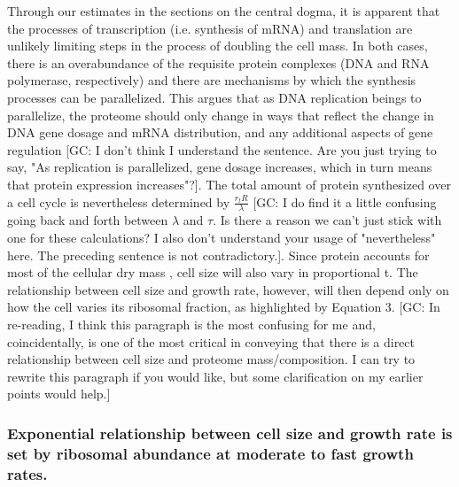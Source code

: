 Through our estimates in the sections on the central dogma, it is
apparent that the processes of transcription (i.e. synthesis of mRNA) and
translation are unlikely limiting steps in the process of doubling the
cell mass. In both cases, there is an overabundance of the requisite protein
complexes (DNA and RNA polymerase, respectively) and there are mechanisms by
which the synthesis processes can be parallelized. This argues that as DNA replication beings to parallelize, the
proteome should only change in ways that reflect the change in DNA gene dosage
and mRNA distribution, and any additional aspects of gene regulation
{\color{red}[GC: I don't think I understand the sentence. Are you just trying to
say, "As replication is parallelized, gene dosage increases, which in turn means
that protein expression increases"?]}.
The total amount of protein synthesized over a cell cycle is nevertheless
determined by $\frac{r_tR}{\lambda}$ {\color{red}[GC: I do find it a little
confusing going back and forth between $\lambda$ and $\tau$. Is there a reason
we can't just stick with one for these calculations? I also don't understand
your usage of "nevertheless" here. The preceding sentence is not contradictory.]}. Since protein accounts for most of
the cellular dry mass \citep{bremer2008, basan2015}, cell size will also vary
in proportional t. The relationship between cell size and growth rate,
however, will then depend only on how the cell varies its ribosomal
fraction, as highlighted by Equation 3. {\color{red}[GC: In re-reading, I think
this paragraph is the most confusing for me and, coincidentally, is one of the
most critical in conveying that there is a direct relationship between cell size
and proteome mass/composition. I can try to rewrite this paragraph if you would 
like, but some clarification on my earlier points would help.]}

\subsubsection{Exponential relationship between cell size and growth rate is
set by ribosomal abundance at moderate to fast growth rates.}

